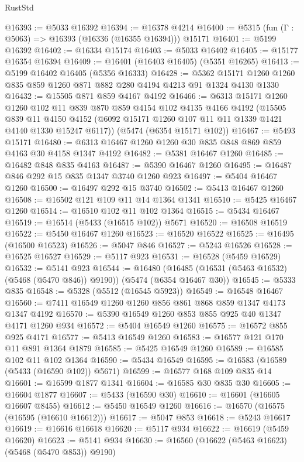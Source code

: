 \begin{lexlean}{RustStd}
\begin{coremodule}
@16393 := @5033 @16392
@16394 := @16378 @4214
@16400 := @5315 (fun (Γ : @5063) => @16393 (@16336 (@16355 @16394))) @15171
@16401 := @5199 @16392
@16402 := @16334 @15174
@16403 := @5033 @16402
@16405 := @15177 @16354 @16394
@16409 := @16401 (@16403 @16405) (@5351 @16265)
@16413 := @5199 @16402 @16405 (@5356 @16333)
@16428 := @5362 @15171 @1260 @1260 @835 @859 @1260 @871 @882 @280 @4194 @4213 @91 @1324 @4130 @1330
@16432 := @15505 @871 @859 @4167 @4192
@16466 := @6313
    @15171
    @1260
    @1260
    @102
    @11
    @839
    @870
    @859
    @4154
    @102
    @4135
    @4166
    @4192
    (@15505
      @839
      @11
      @4150
      @4152
      (@6092 @15171 @1260 @107 @11 @11 @1339 @1421 @4140 @1330 @15247 @6117))
    (@5474 (@6354 @15171 @102))
@16467 := @5493 @15171
@16480 := @6313 @16467 @1260 @1260 @30 @835 @848 @869 @859 @4163 @30 @4158 @1347 @4192
@16482 := @5381 @16467 @1260
@16485 := @16482 @848 @835 @4163
@16487 := @5390 @16467 @1260
@16495 := @16487 @846 @292 @15 @835 @1347 @3740 @1260 @923
@16497 := @5404 @16467 @1260
@16500 := @16497 @292 @15 @3740
@16502 := @5413 @16467 @1260
@16508 := @16502 @121 @109 @11 @14 @1364 @1341
@16510 := @5425 @16467 @1260
@16514 := @16510 @102 @11 @102 @1364
@16515 := @5434 @16467
@16519 := @16514 (@5433 (@16515 @102)) @5671
@16520 := @16508 @16519
@16522 := @5450 @16467 @1260
@16523 := @16520 @16522
@16525 := @16495 (@16500 @16523)
@16526 := @5047 @846
@16527 := @5243 @16526
@16528 := @16525 @16527
@16529 := @5117 @923
@16531 := @16528 (@5459 @16529)
@16532 := @5141 @923
@16544 := @16480
    (@16485 (@16531 (@5463 @16532) (@5468 (@5470 @846)) @9190))
    (@5474 (@6354 @16467 @30))
@16545 := @5333 @835
@16548 := @5328 (@5512 (@16545 @5923))
@16549 := @16548 @16467
@16560 := @7411 @16549 @1260 @1260 @856 @861 @868 @859 @1347 @4173 @1347 @4192
@16570 := @5390 @16549 @1260 @853 @855 @925 @40 @1347 @4171 @1260 @934
@16572 := @5404 @16549 @1260
@16575 := @16572 @855 @925 @4171
@16577 := @5413 @16549 @1260
@16583 := @16577 @121 @170 @11 @891 @1364 @1879
@16585 := @5425 @16549 @1260
@16589 := @16585 @102 @11 @102 @1364
@16590 := @5434 @16549
@16595 := @16583 (@16589 (@5433 (@16590 @102)) @5671)
@16599 := @16577 @168 @109 @835 @14
@16601 := @16599 @1877 @1341
@16604 := @16585 @30 @835 @30
@16605 := @16604 @1877
@16607 := @5433 (@16590 @30)
@16610 := @16601 (@16605 @16607 @8455)
@16612 := @5450 @16549 @1260
@16616 := @16570 (@16575 (@16595 (@16610 @16612)))
@16617 := @5047 @853
@16618 := @5243 @16617
@16619 := @16616 @16618
@16620 := @5117 @934
@16622 := @16619 (@5459 @16620)
@16623 := @5141 @934
@16630 := @16560 (@16622 (@5463 @16623) (@5468 (@5470 @853)) @9190)

\end{coremodule}
\end{lexlean}
